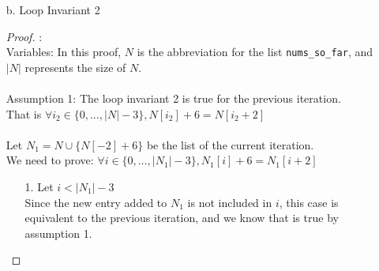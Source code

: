 \documentclass[fontsize=11pt]{article}
\begin{document}
\begin{enumerate}
\begin{enumerate}
\begin{proof}
\begin{enumerate}
    \item[1.] Proving for $gcd(N[-2] + 6, 2) = 1$ \\
        Pick $a = N[-2], k = 3, n = 2$ \\
        Since we know $gcd(N[-2], 2) = 1$, $gcd(a, n) = 1$ is true. \\
        Therefore, by assumption 2, we know that $gcd(a + kn, n) = 1$ is also true. \\
        Substituting the varaibles back, we know $gcd(N[-2] + 6, 2) = 1$.
    \item[2.] Proving for $gcd(N[-2] + 6, 3) = 1$ \\
        Pick $a = N[-2], k = 2, n = 3$ \\
        Since we know $gcd(N[-2], 3) = 1$, $gcd(a, n) = 1$ is true. \\
        Therefore, by assumption 2, we know that $gcd(a + kn, n) = 1$ is also true. \\
        Substituting the varaibles back, we know $gcd(N[-2] + 6, 3) = 1$.
\end{enumerate}
\end{proof}

\item[b.] Loop Invariant 2
\begin{proof} : \\
Variables: In this proof, $N$ is the abbreviation for the list \texttt{nums\_so\_far}, and $|N|$ represents the size of $N$. \\
\\
Assumption 1: The loop invariant 2 is true for the previous iteration. \\
That is $\forall i_2 \in \{ 0, \dots, |N| - 3\}, N[i_2] + 6 = N[i_2 + 2]$ \\
\\
Let $N_1 = N \cup \{ N[-2] + 6 \}$ be the list of the current iteration. \\
We need to prove: $\forall i \in \{0, \dots, |N_1| - 3\}, N_1[i] + 6 = N_1[i + 2] $

\begin{enumerate}
    \item[1.] Let $i < |N_1| - 3$ \\
        Since the new entry added to $N_1$ is not included in $i$, this case is equivalent to the previous iteration, and we know that is true by assumption 1.


\end{enumerate}
\end{proof}
\end{enumerate}
\end{enumerate}
\end{document}
